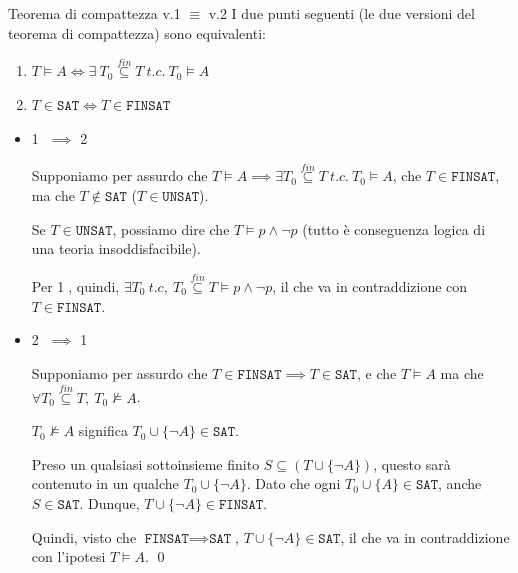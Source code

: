\documentclass[a4paper,11pt]{report}
\newcommand{\SAT}{\texttt{SAT}}
\newcommand{\FINSAT}{\texttt{FINSAT}}
\begin{document}
\begin{lemmaframe}{Teorema di compattezza v.1 \( \equiv \) v.2}{}
    I due punti seguenti (le due versioni del teorema di compattezza) sono equivalenti:
    \begin{enumerate}
        \item \( T \vDash A \iff \exists \ T_0 \overset{fin}{\subseteq} T \ t.c. \  T_0 \vDash A\)
        \item \( T \in \texttt{SAT} \iff T \in \texttt{FINSAT} \)
    \end{enumerate}

\end{lemmaframe}
    \begin{pframe}{}
        \begin{itemize}
            \item \textcircled{1} \( \implies \) \textcircled{2}

                Supponiamo per assurdo che \( T\vDash A \implies \exists T_0  \overset{fin}{\subseteq } T \ t.c. \ T_0 \vDash A\), che \( T\in \texttt{FINSAT} \), ma che \( T\not \in \texttt{SAT} \) (\( T\in \texttt{UNSAT} \)).

                Se \( T \in \texttt{UNSAT} \), possiamo dire che \( T \vDash p \land \neg p \) {\small \color{gray} (tutto è conseguenza logica di una teoria insoddisfacibile)}.

                Per \textcircled{1}, quindi, \( \exists T_0 \ t.c, \ T_0 \overset{fin}{\subseteq } T \vDash p \land \neg p \), il che va in contraddizione con \( T \in \texttt{FINSAT} \).

            \item \textcircled{2} \( \implies \) \textcircled{1}

                Supponiamo per assurdo che \( T \in \texttt{FINSAT} \implies T \in \texttt{SAT} \), e che \( T \vDash A \) ma che \( \forall T_0 \overset{fin}{\subseteq } T, \ T_0 \not\vDash A \).

                \( T_0 \not\vDash A \) significa \( T_0 \cup \{\neg A\} \in \texttt{SAT} \).

                Preso un qualsiasi sottoinsieme finito \( S \subseteq (T \cup \{\neg A\}) \), questo sarà contenuto in un qualche \( T_0 \cup \{\neg A\} \). Dato che ogni \( T_0 \cup \{A\} \in \SAT\), anche \( S \in \SAT \). Dunque, \( T \cup \{\neg A\} \in \FINSAT \).
                
                Quindi, visto che \( \texttt{FINSAT} \implies \texttt{SAT} \), \( T \cup \{ \neg A\} \in \texttt{SAT}\), il che va in contraddizione con l'ipotesi \( T \vDash A \). \qed
        \end{itemize}

    \end{pframe}
\end{document}
